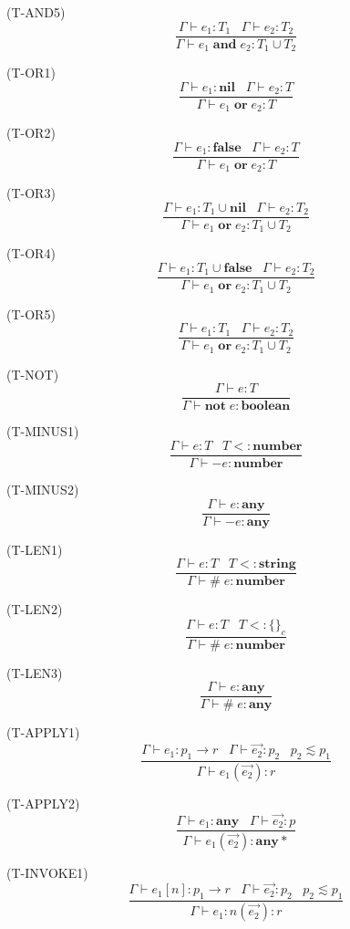 \documentclass{paper}
\newcommand{\Any}{\mathbf{any}}
\newcommand{\Nil}{\mathbf{nil}}
\newcommand{\False}{\mathbf{false}}
\newcommand{\Boolean}{\mathbf{boolean}}
\newcommand{\Number}{\mathbf{number}}
\newcommand{\String}{\mathbf{string}}
\newcommand{\mylabel}[1]{\; (\textsc{#1})}
\newcommand{\env}{\Gamma}
\newcommand{\subtype}{<:}
\begin{document}
\mylabel{T-AND5}
\[
\dfrac{\env \vdash e_{1}:T_{1} \;\;\;
       \env \vdash e_{2}:T_{2}}
      {\env \vdash e_{1} \; \mathbf{and} \; e_{2}:T_{1} \cup T_{2}}
\]

\mylabel{T-OR1}
\[
\dfrac{\env \vdash e_{1}:\Nil \;\;\;
       \env \vdash e_{2}:T}
      {\env \vdash e_{1} \; \mathbf{or} \; e_{2}:T}
\]

\mylabel{T-OR2}
\[
\dfrac{\env \vdash e_{1}:\False \;\;\;
       \env \vdash e_{2}:T}
      {\env \vdash e_{1} \; \mathbf{or} \; e_{2}:T}
\]

\mylabel{T-OR3}
\[
\dfrac{\env \vdash e_{1}:T_{1} \cup \Nil \;\;\;
       \env \vdash e_{2}:T_{2}}
      {\env \vdash e_{1} \; \mathbf{or} \; e_{2}:T_{1} \cup T_{2}}
\]

\mylabel{T-OR4}
\[
\dfrac{\env \vdash e_{1}:T_{1} \cup \False \;\;\;
       \env \vdash e_{2}:T_{2}}
      {\env \vdash e_{1} \; \mathbf{or} \; e_{2}:T_{1} \cup T_{2}}
\]

\mylabel{T-OR5}
\[
\dfrac{\env \vdash e_{1}:T_{1} \;\;\;
       \env \vdash e_{2}:T_{2}}
      {\env \vdash e_{1} \; \mathbf{or} \; e_{2}:T_{1} \cup T_{2}}
\]

\mylabel{T-NOT}
\[
\dfrac{\env \vdash e:T}
      {\env \vdash \mathbf{not} \; e:\Boolean}
\]

\mylabel{T-MINUS1}
\[
\dfrac{\env \vdash e:T \;\;\;
       T \subtype \Number}
      {\env \vdash - e:\Number}
\]

\mylabel{T-MINUS2}
\[
\dfrac{\env \vdash e:\Any}
      {\env \vdash - e:\Any}
\]

\mylabel{T-LEN1}
\[
\dfrac{\env \vdash e:T \;\;\;
       T \subtype \String}
      {\env \vdash \# \; e:\Number}
\]

\mylabel{T-LEN2}
\[
\dfrac{\env \vdash e:T \;\;\;
       T \subtype \{\}_{c}}
      {\env \vdash \# \; e:\Number}
\]

\mylabel{T-LEN3}
\[
\dfrac{\env \vdash e:\Any}
      {\env \vdash \# \; e:\Any}
\]

\mylabel{T-APPLY1}
\[
\dfrac{\env \vdash e_{1}:p_{1} \rightarrow r \;\;\;
       \env \vdash \vec{e_{2}}:p_{2} \;\;\;
       p_{2} \lesssim p_{1}}
      {\env \vdash e_{1}(\vec{e_{2}}):r}
\]

\mylabel{T-APPLY2}
\[
\dfrac{\env \vdash e_{1}:\Any \;\;\;
       \env \vdash \vec{e_{2}}:p}
      {\env \vdash e_{1}(\vec{e_{2}}):\Any{*}}
\]

\mylabel{T-INVOKE1}
\[
\dfrac{\env \vdash e_{1}[n]:p_{1} \rightarrow r \;\;\;
       \env \vdash \vec{e_{2}}:p_{2} \;\;\;
       p_{2} \lesssim p_{1}}
      {\env \vdash e_{1}{:}n(\vec{e_{2}}):r}
\]
\end{document}
